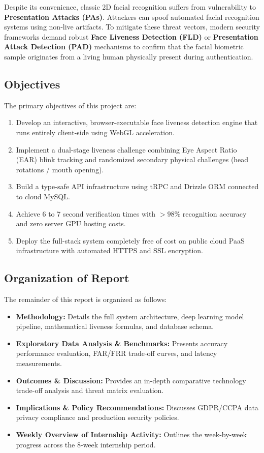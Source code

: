 \documentclass[12pt,a4paper,oneside]{article}
\begin{document}
Despite its convenience, classic 2D facial recognition suffers from vulnerability to \textbf{Presentation Attacks (PAs)}. Attackers can spoof automated facial recognition systems using non-live artifacts. To mitigate these threat vectors, modern security frameworks demand robust \textbf{Face Liveness Detection (FLD)} or \textbf{Presentation Attack Detection (PAD)} mechanisms to confirm that the facial biometric sample originates from a living human physically present during authentication.

\subsection{Objectives}
The primary objectives of this project are:
\begin{enumerate}
    \item Develop an interactive, browser-executable face liveness detection engine that runs entirely client-side using WebGL acceleration.
    \item Implement a dual-stage liveness challenge combining Eye Aspect Ratio (EAR) blink tracking and randomized secondary physical challenges (head rotations / mouth opening).
    \item Build a type-safe API infrastructure using tRPC and Drizzle ORM connected to cloud MySQL.
    \item Achieve 6 to 7 second verification times with $> 98\%$ recognition accuracy and zero server GPU hosting costs.
    \item Deploy the full-stack system completely free of cost on public cloud PaaS infrastructure with automated HTTPS and SSL encryption.
\end{enumerate}

\subsection{Organization of Report}
The remainder of this report is organized as follows:
\begin{itemize}
    \item \textbf{Methodology:} Details the full system architecture, deep learning model pipeline, mathematical liveness formulas, and database schema.
    \item \textbf{Exploratory Data Analysis \& Benchmarks:} Presents accuracy performance evaluation, FAR/FRR trade-off curves, and latency measurements.
    \item \textbf{Outcomes \& Discussion:} Provides an in-depth comparative technology trade-off analysis and threat matrix evaluation.
    \item \textbf{Implications \& Policy Recommendations:} Discusses GDPR/CCPA data privacy compliance and production security policies.
    \item \textbf{Weekly Overview of Internship Activity:} Outlines the week-by-week progress across the 8-week internship period.
\end{itemize}
\end{document}
